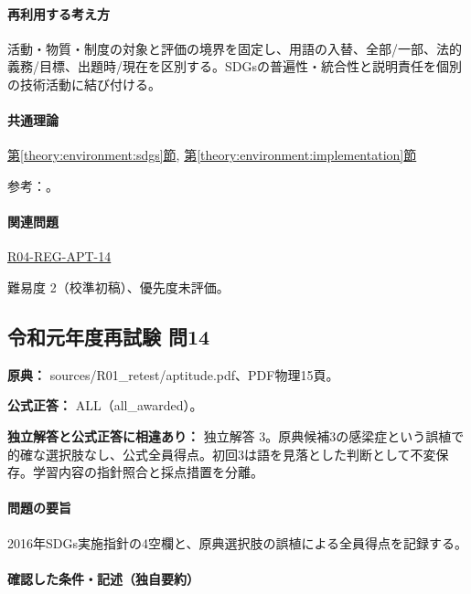 \paragraph{再利用する考え方} 活動・物質・制度の対象と評価の境界を固定し、用語の入替、全部/一部、法的義務/目標、出題時/現在を区別する。SDGsの普遍性・統合性と説明責任を個別の技術活動に結び付ける。

\paragraph{共通理論} \hyperref[theory:environment:sdgs]{第\ref*{theory:environment:sdgs}節}, \hyperref[theory:environment:implementation]{第\ref*{theory:environment:implementation}節}

\par 参考：\cite{env_sdgs_agenda,env_sdgs2016,env_sdgs_un}。

\paragraph{関連問題} \hyperref[q:r04-reg-apt-14]{R04-REG-APT-14}

\par 難易度 2（校準初稿）、優先度未評価。

\subsection{令和元年度再試験 問14}
\label{q:r01-ret-apt-14}

\noindent\textbf{原典：} sources/R01\_retest/aptitude.pdf、PDF物理15頁。

\textbf{公式正答：} ALL（all\_awarded）。

\par\textbf{独立解答と公式正答に相違あり：} 独立解答 3。原典候補3の感梁症という誤植で的確な選択肢なし、公式全員得点。初回3は語を見落とした判断として不変保存。学習内容の指針照合と採点措置を分離。

\paragraph{問題の要旨} 2016年SDGs実施指針の4空欄と、原典選択肢の誤植による全員得点を記録する。

\paragraph{確認した条件・記述（独自要約）}\mbox{}\par

